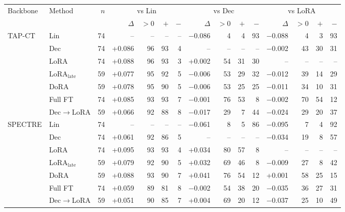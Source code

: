\setlength{\tabcolsep}{3.5pt}
\begin{tabular}{@{}llrrrrrrrrrrrrr@{}}
\toprule
Backbone & Method & $n$ & \multicolumn{4}{c}{vs Lin} & \multicolumn{4}{c}{vs Dec} & \multicolumn{4}{c}{vs LoRA} \\
\cmidrule(lr){4-7}\cmidrule(lr){8-11}\cmidrule(lr){12-15}
 & & & $\Delta$ & $>0$ & $+$ & $-$ & $\Delta$ & $>0$ & $+$ & $-$ & $\Delta$ & $>0$ & $+$ & $-$ \\
\midrule
TAP-CT & Lin & 74 & -- & -- & -- & -- & $-$0.086 & 4 & 4 & 93 & $-$0.088 & 4 & 3 & 93 \\
 & Dec & 74 & +0.086 & 96 & 93 & 4 & -- & -- & -- & -- & $-$0.002 & 43 & 30 & 31 \\
 & LoRA & 74 & +0.088 & 96 & 93 & 3 & +0.002 & 54 & 31 & 30 & -- & -- & -- & -- \\
 & LoRA$_{\text{late}}$ & 59 & +0.077 & 95 & 92 & 5 & $-$0.006 & 53 & 29 & 32 & $-$0.012 & 39 & 14 & 29 \\
 & DoRA & 59 & +0.078 & 95 & 90 & 5 & $-$0.006 & 53 & 25 & 25 & $-$0.011 & 34 & 10 & 31 \\
 & Full FT & 74 & +0.085 & 93 & 93 & 7 & $-$0.001 & 76 & 53 & 8 & $-$0.002 & 70 & 54 & 12 \\
 & Dec$\to$LoRA & 59 & +0.066 & 92 & 88 & 8 & $-$0.017 & 29 & 7 & 44 & $-$0.024 & 29 & 20 & 37 \\
\addlinespace
SPECTRE & Lin & 74 & -- & -- & -- & -- & $-$0.061 & 8 & 5 & 86 & $-$0.095 & 7 & 4 & 92 \\
 & Dec & 74 & +0.061 & 92 & 86 & 5 & -- & -- & -- & -- & $-$0.034 & 19 & 8 & 57 \\
 & LoRA & 74 & +0.095 & 93 & 93 & 4 & +0.034 & 80 & 57 & 8 & -- & -- & -- & -- \\
 & LoRA$_{\text{late}}$ & 59 & +0.079 & 92 & 90 & 5 & +0.032 & 69 & 46 & 8 & $-$0.009 & 27 & 8 & 42 \\
 & DoRA & 59 & +0.088 & 93 & 90 & 7 & +0.041 & 76 & 54 & 12 & +0.001 & 58 & 25 & 15 \\
 & Full FT & 74 & +0.059 & 89 & 81 & 8 & $-$0.002 & 54 & 38 & 20 & $-$0.035 & 36 & 27 & 31 \\
 & Dec$\to$LoRA & 59 & +0.051 & 90 & 85 & 7 & +0.004 & 69 & 20 & 12 & $-$0.037 & 25 & 10 & 49 \\
\bottomrule
\end{tabular}

